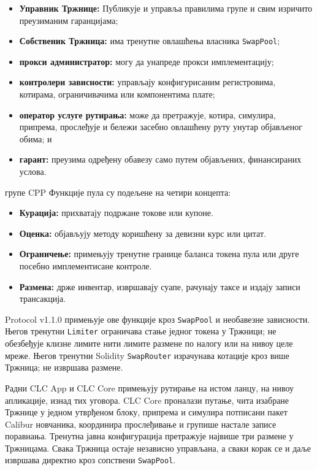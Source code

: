 \documentclass[11pt]{article}
\begin{document}
\begin{itemize}[leftmargin=*]
\item \textbf{Управник Тржнице:} Публикује и управља правилима групе и свим изричито преузиманим гаранцијама;
\item \textbf{Собственик Тржница:} има тренутне овлашћења власника \texttt{SwapPool};
\item \textbf{прокси администратор:} могу да унапреде прокси имплементацију;
\item \textbf{контролери зависности:} управљају конфигурисаним регистровима, котирама, ограничивачима или компонентима плате;
\item \textbf{оператор услуге рутирања:} може да претражује, котира, симулира, припрема, прослеђује и бележи засебно овлашћену руту унутар објављеног обима; и
\item \textbf{гарант:} преузима одређену обавезу само путем објављених, финансираних услова.
\end{itemize}
групе CPP Функције пула су подељене на четири концепта:

\begin{itemize}[leftmargin=*]
\item \textbf{Курација:} прихватају подржане токове или купоне.
\item \textbf{Оценка:} објављују методу коришћену за девизни курс или цитат.
\item \textbf{Ограничење:} примењују тренутне границе баланса токена пула или друге посебно имплементисане контроле.
\item \textbf{Размена:} држе инвентар, извршавају суапе, рачунају таксе и издају записи трансакција.
\end{itemize}
Protocol v1.1.0 примењује ове функције кроз \texttt{SwapPool} и необавезне зависности. Његов тренутни \texttt{Limiter} ограничава стање једног токена у Тржници; не обезбеђује клизне лимите нити лимите размене по налогу или на нивоу целе мреже. Његов тренутни Solidity \texttt{SwapRouter} израчунава котације кроз више Тржница; не извршава размене.

Радни CLC App и CLC Core примењују рутирање на истом ланцу, на нивоу апликације, изнад тих уговора. CLC Core проналази путање, чита изабране Тржнице у једном утврђеном блоку, припрема и симулира потписани пакет Calibur новчаника, координира прослеђивање и групише настале записе поравнања. Тренутна јавна конфигурација претражује највише три размене у Тржницама. Свака Тржница остаје независно управљана, а сваки корак се и даље извршава директно кроз сопствени \texttt{SwapPool}.
\end{document}
